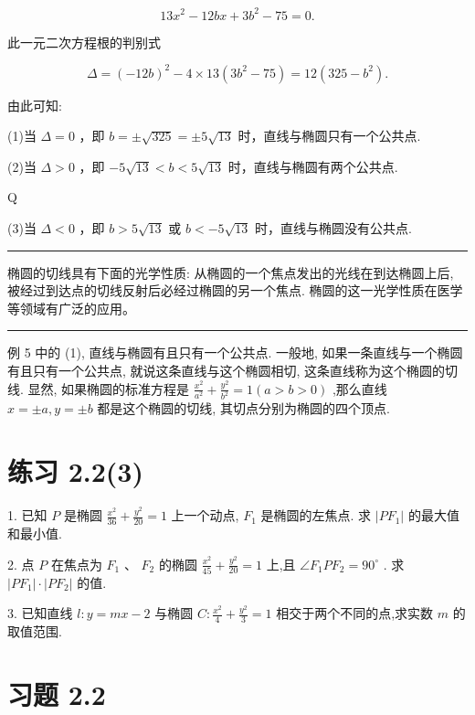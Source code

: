\documentclass[10pt]{article}
\newcommand{\HRule}{\begin{center}\rule{0.9\linewidth}{0.2mm}\end{center}}
\begin{document}
\[
{13}{x}^{2} - {12bx} + 3{b}^{2} - {75} = 0.
\]

此一元二次方程根的判别式

\[
\Delta  = {\left( -{12}b\right) }^{2} - 4 \times  {13}\left( {3{b}^{2} - {75}}\right)  = {12}\left( {{325} - {b}^{2}}\right) .
\]

由此可知:

(1)当 \(\Delta  = 0\) ，即 \(b =  \pm  \sqrt{325} =  \pm  5\sqrt{13}\) 时，直线与椭圆只有一个公共点.

(2)当 \(\Delta  > 0\) ，即 \(- 5\sqrt{13} < b < 5\sqrt{13}\) 时，直线与椭圆有两个公共点.

Q

(3)当 \(\Delta  < 0\) ，即 \(b > 5\sqrt{13}\) 或 \(b <  - 5\sqrt{13}\) 时，直线与椭圆没有公共点.

\HRule

椭圆的切线具有下面的光学性质: 从椭圆的一个焦点发出的光线在到达椭圆上后, 被经过到达点的切线反射后必经过椭圆的另一个焦点. 椭圆的这一光学性质在医学等领域有广泛的应用。

\HRule

例 5 中的 (1), 直线与椭圆有且只有一个公共点. 一般地, 如果一条直线与一个椭圆有且只有一个公共点, 就说这条直线与这个椭圆相切, 这条直线称为这个椭圆的切线. 显然, 如果椭圆的标准方程是 \(\frac{{x}^{2}}{{a}^{2}} + \frac{{y}^{2}}{{b}^{2}} = 1\left( {a > b > 0}\right)\) ,那么直线 \(x =  \pm  a,y =  \pm  b\) 都是这个椭圆的切线, 其切点分别为椭圆的四个顶点.

\section*{练习 2.2(3)}

1. 已知 \(P\) 是椭圆 \(\frac{{x}^{2}}{36} + \frac{{y}^{2}}{20} = 1\) 上一个动点, \({F}_{1}\) 是椭圆的左焦点. 求 \(\left| {P{F}_{1}}\right|\) 的最大值和最小值.

2. 点 \(P\) 在焦点为 \({F}_{1}\text{ 、 }{F}_{2}\) 的椭圆 \(\frac{{x}^{2}}{45} + \frac{{y}^{2}}{20} = 1\) 上,且 \(\angle {F}_{1}P{F}_{2} = {90}^{ \circ  }\) . 求 \(\left| {P{F}_{1}}\right|  \cdot  \left| {P{F}_{2}}\right|\) 的值.

3. 已知直线 \(l : y = {mx} - 2\) 与椭圆 \(C : \frac{{x}^{2}}{4} + \frac{{y}^{2}}{3} = 1\) 相交于两个不同的点,求实数 \(m\) 的取值范围.

\section*{习题 2.2}
\end{document}

